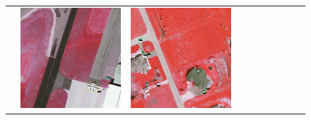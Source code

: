 \begin{figure}[H]
\begin{tabularx}{\textwidth}{c|*{9}{X}}
    &  \includegraphics[trim={650pt 120pt 170pt 720pt},clip,width=\linewidth]{images/015Results/02perm_exp/comp_images/rirb/487.png}
    & \includegraphics[trim={230pt 200pt 680pt 725pt},clip,width=\linewidth]{images/015Results/02perm_exp/comp_images/rirb/509.png}

\end{tabularx}
\end{figure}
